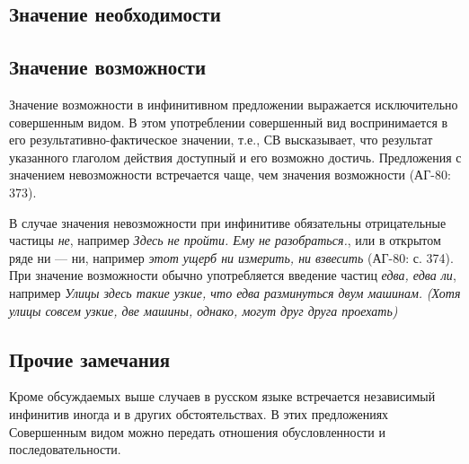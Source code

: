 

\subsection{Значение необходимости}


\subsection{Значение возможности}

Значение возможности в инфинитивном предложении выражается исключительно совершенным видом. В этом употреблении совершенный вид воспринимается в его результативно-фактическое значении, т.е., СВ высказывает, что результат указанного глаголом действия доступный и его возможно достичь. Предложения с значением невозможности встречается чаще, чем значения возможности (АГ-80: 373). 

В случае значения невозможности при инфинитиве обязательны отрицательные частицы \textit{не}, например \textit{Здесь не пройти. Ему не разобраться.}, или в открытом ряде ни --- ни, например \textit{этот ущерб ни измерить, ни взвесить} (АГ-80: с. 374). При значение возможности обычно употребляется введение частиц \textit{едва, едва ли}, например \textit{Улицы здесь такие узкие, что едва разминуться двум машинам.} \textit{(Хотя улицы совсем узкие, две машины, однако, могут друг друга проехать)}
\subsection{Прочие замечания}

Кроме обсуждаемых выше случаев в русском языке встречается независимый инфинитив иногда и в других обстоятельствах. В этих предложениях Совершенным видом можно передать отношения обусловленности и последовательности. 